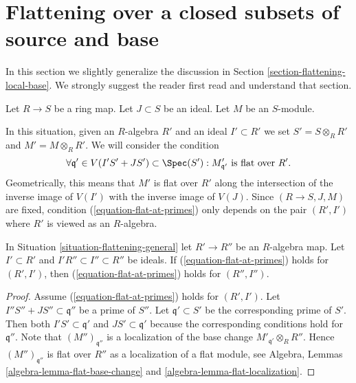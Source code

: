 \section{Flattening over a closed subsets of source and base}
\label{section-flattening-local-source-base}

\noindent
In this section we slightly generalize the discussion in
Section \ref{section-flattening-local-base}.
We strongly suggest the reader first read and understand
that section.

\begin{situation}
\label{situation-flattening-general}
Let $R \to S$ be a ring map. Let $J \subset S$ be an ideal.
Let $M$ be an $S$-module.
\end{situation}

\noindent
In this situation, given an $R$-algebra $R'$ and an ideal $I' \subset R'$
we set $S' = S \otimes_R R'$ and $M' = M \otimes_R R'$.
We will consider the condition
\begin{equation}
\label{equation-flat-at-primes}
\forall \mathfrak q' \in V(I'S' + JS') \subset \Spec(S') :
M'_{\mathfrak q'}\text{ is flat over }R'.
\end{equation}
Geometrically, this means that $M'$ is flat over $R'$ along the intersection
of the inverse image of $V(I')$ with the inverse image of $V(J)$.
Since $(R \to S, J, M)$ are fixed, condition (\ref{equation-flat-at-primes})
only depends on the pair $(R', I')$ where $R'$ is viewed as an $R$-algebra.

\begin{lemma}
\label{lemma-base-change-flat-at-primes}
In Situation \ref{situation-flattening-general}
let $R' \to R''$ be an $R$-algebra map.
Let $I' \subset R'$ and $I'R'' \subset I'' \subset R''$ be ideals.
If (\ref{equation-flat-at-primes}) holds for
$(R', I')$, then (\ref{equation-flat-at-primes})
holds for $(R'', I'')$.
\end{lemma}

\begin{proof}
Assume (\ref{equation-flat-at-primes}) holds for $(R', I')$.
Let $I''S'' + JS'' \subset \mathfrak q''$ be a prime of $S''$.
Let $\mathfrak q' \subset S'$ be the corresponding prime of $S'$.
Then both $I'S' \subset \mathfrak q'$ and $JS' \subset \mathfrak q'$
because the corresponding conditions hold for $\mathfrak q''$.
Note that $(M'')_{\mathfrak q''}$
is a localization of the base change $M'_{\mathfrak q'} \otimes_R R''$.
Hence $(M'')_{\mathfrak q''}$ is flat over $R''$ as a localization
of a flat module, see
Algebra, Lemmas \ref{algebra-lemma-flat-base-change} and
\ref{algebra-lemma-flat-localization}.
\end{proof}

